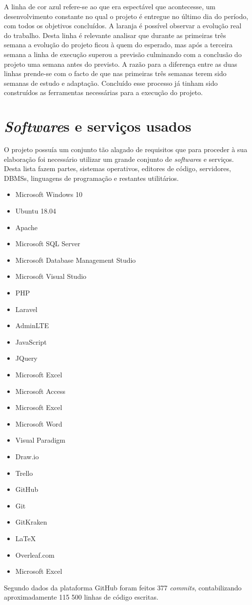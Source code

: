 \noindent
A linha de cor azul refere-se ao que era espectável que acontecesse, um desenvolvimento constante no qual o projeto é entregue no último dia do período, com todos os objetivos concluídos. A laranja é possível observar a evolução real do trabalho. Desta linha é relevante analisar que durante as primeiras três semana a evolução do projeto ficou à quem do esperado, mas após a terceira semana a linha de execução superou a previsão culminando com a conclusão do projeto uma semana antes do previsto. A razão para a diferença entre as duas linhas prende-se com o facto de que nas primeiras três semanas terem sido semanas de estudo e adaptação. Concluído esse processo já tinham sido construídos as ferramentas necessárias para a execução do projeto.

\section{\textit{Software}s e serviços usados}
O projeto possuía um conjunto tão alagado de requisitos que para proceder à sua elaboração foi necessário utilizar um grande conjunto de \textit{software}s e serviços. Desta lista fazem partes, sistemas operativos, editores de código, servidores, DBMSs, linguagens de programação e restantes utilitários.

\begin{multicols}{3}
	\begin{itemize}
		\item Microsoft Windows 10
		\item Ubuntu 18.04
		
		\item Apache
		\item Microsoft SQL Server
		
		\item Microsoft Database Management Studio
		\item Microsoft Visual Studio
		
		\item PHP
		\item Laravel
		\item AdminLTE
		\item JavaScript
		\item JQuery
		
		\item Microsoft Excel
		\item Microsoft Access
		\item Microsoft Excel
		\item Microsoft Word
		
		\item Visual Paradigm
		\item Draw.io
		
		\item Trello
		\item GitHub
		\item Git
		\item GitKraken
		
		\item \LaTeX
		\item Overleaf.com
		\item Microsoft Excel
	\end{itemize}
\end{multicols}

Segundo dados da plataforma GitHub foram feitos 377 \textit{commits}, contabilizando aproximadamente 115 500 linhas de código escritas.